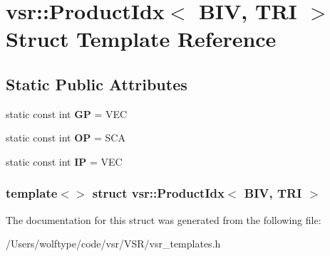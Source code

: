 \hypertarget{structvsr_1_1_product_idx_3_01_b_i_v_00_01_t_r_i_01_4}{\section{vsr\-:\-:Product\-Idx$<$ B\-I\-V, T\-R\-I $>$ Struct Template Reference}
\label{structvsr_1_1_product_idx_3_01_b_i_v_00_01_t_r_i_01_4}
}
\subsection*{Static Public Attributes}
\begin{DoxyCompactItemize}
\item 
\hypertarget{structvsr_1_1_product_idx_3_01_b_i_v_00_01_t_r_i_01_4_ac95fcace41ca546d2a49f017b3f864ed}{static const int {\bfseries G\-P} = V\-E\-C}\label{structvsr_1_1_product_idx_3_01_b_i_v_00_01_t_r_i_01_4_ac95fcace41ca546d2a49f017b3f864ed}

\item 
\hypertarget{structvsr_1_1_product_idx_3_01_b_i_v_00_01_t_r_i_01_4_aa729a88079aaa24c9685a24daba4c625}{static const int {\bfseries O\-P} = S\-C\-A}\label{structvsr_1_1_product_idx_3_01_b_i_v_00_01_t_r_i_01_4_aa729a88079aaa24c9685a24daba4c625}

\item 
\hypertarget{structvsr_1_1_product_idx_3_01_b_i_v_00_01_t_r_i_01_4_a35d661722adacfbf22940b0526d52555}{static const int {\bfseries I\-P} = V\-E\-C}\label{structvsr_1_1_product_idx_3_01_b_i_v_00_01_t_r_i_01_4_a35d661722adacfbf22940b0526d52555}

\end{DoxyCompactItemize}
\subsubsection*{template$<$$>$ struct vsr\-::\-Product\-Idx$<$ B\-I\-V, T\-R\-I $>$}



The documentation for this struct was generated from the following file\-:\begin{DoxyCompactItemize}
\item 
/\-Users/wolftype/code/vsr/\-V\-S\-R/vsr\-\_\-templates.\-h\end{DoxyCompactItemize}
